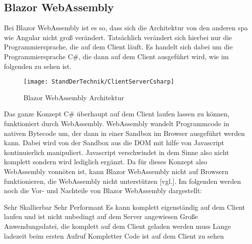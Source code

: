\subsection{Blazor WebAssembly}
Bei Blazor WebAssembly ist es so, dass sich die Architektur von den anderen \ac{spa} wie Angular
nicht groß verändert. Tatsächlich verändert sich hierbei nur die Programmiersprache, die auf dem
Client läuft. Es handelt sich dabei um die Programmiersprache C\#, die dann auf dem Client
ausgeführt wird, wie im folgenden zu sehen ist.
\begin{figure}[h]
    \centering
    \texttt{[image: StandDerTechnik/ClientServerCsharp]}
    \caption[Blazor WebAssembly Architektur]{Blazor WebAssembly Architektur}
    \label{img:clientservercsharp}
\end{figure}
\newline
\newline
Das ganze Konzept C\# überhaupt auf dem Client laufen lassen zu können, funktioniert durch
WebAssembly. WebAssembly wandelt Programmcode in nativen Bytecode um, der dann in einer Sandbox
im Browser ausgeführt werden kann. Dabei wird von der Sandbox aus die DOM mit hilfe von
Javascript kontinuierlich manipuliert. Javascript verschwindet in dem Sinne also nicht komplett
sondern wird lediglich ergänzt.
Da für dieses Konzept also WebAssembly vonnöten ist, kann Blazor WebAssembly nicht auf Browsern
funktionieren, die WebAssembly nicht unterstützen \cite{HierKommtBlazor}[vgl.].
\newline
\newline
Im folgenden werden noch die Vor- und Nachteile von Blazor WebAssembly dargestellt:
\begin{itemize}
    \pro Sehr Skallierbar
    \pro Sehr Performant
    \pro Es kann komplett eigenständig auf dem Client laufen und ist nicht unbedingt auf dem
    Server angewiesen
    \con Große Anwendungsdatei, die komplett auf dem Client geladen werden muss
    \con Lange ladezeit beim ersten Aufruf
    \con Kompletter Code ist auf dem Client zu sehen
\end{itemize}


